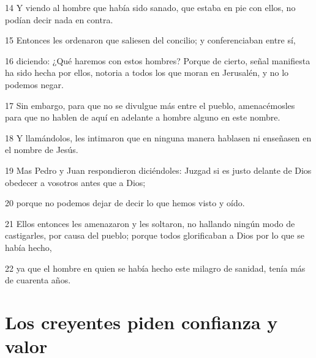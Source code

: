 \par 14 Y viendo al hombre que había sido sanado, que estaba en pie con ellos, no podían decir nada en contra.
\par 15 Entonces les ordenaron que saliesen del concilio; y conferenciaban entre sí,
\par 16 diciendo: ¿Qué haremos con estos hombres? Porque de cierto, señal manifiesta ha sido hecha por ellos, notoria a todos los que moran en Jerusalén, y no lo podemos negar.
\par 17 Sin embargo, para que no se divulgue más entre el pueblo, amenacémosles para que no hablen de aquí en adelante a hombre alguno en este nombre.
\par 18 Y llamándolos, les intimaron que en ninguna manera hablasen ni enseñasen en el nombre de Jesús.
\par 19 Mas Pedro y Juan respondieron diciéndoles: Juzgad si es justo delante de Dios obedecer a vosotros antes que a Dios;
\par 20 porque no podemos dejar de decir lo que hemos visto y oído.
\par 21 Ellos entonces les amenazaron y les soltaron, no hallando ningún modo de castigarles, por causa del pueblo; porque todos glorificaban a Dios por lo que se había hecho,
\par 22 ya que el hombre en quien se había hecho este milagro de sanidad, tenía más de cuarenta años.

\section*{Los creyentes piden confianza y valor}


